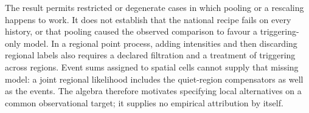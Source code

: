 The result permits restricted or degenerate cases in which pooling or a rescaling happens to work. It does not establish that the national recipe fails on every history, or that pooling caused the observed comparison to favour a triggering-only model. In a regional point process, adding intensities and then discarding regional labels also requires a declared filtration and a treatment of triggering across regions. Event sums assigned to spatial cells cannot supply that missing model: a joint regional likelihood includes the quiet-region compensators as well as the events. The algebra therefore motivates specifying local alternatives on a common observational target; it supplies no empirical attribution by itself.
